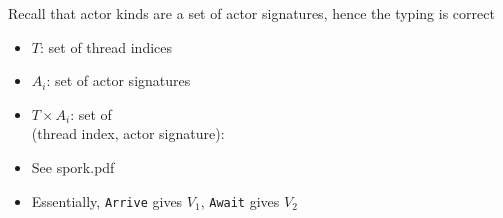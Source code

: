 \begin{minipage}[t]{0.48\textwidth}\fixminipage


Recall that actor kinds are a set of actor signatures, hence the typing is correct
\begin{itemize}
  \item $T$: set of thread indices
  \item $A_i$: set of actor signatures
  \item $T \times A_i$: set of\\(thread index, actor signature): 
\end{itemize}

\vspace{6mm}
\begin{itemize}
  \item See spork.pdf
  \item Essentially, \texttt{Arrive} gives $V_1$, \texttt{Await} gives $V_2$
\end{itemize}
\end{minipage}
\newpage
